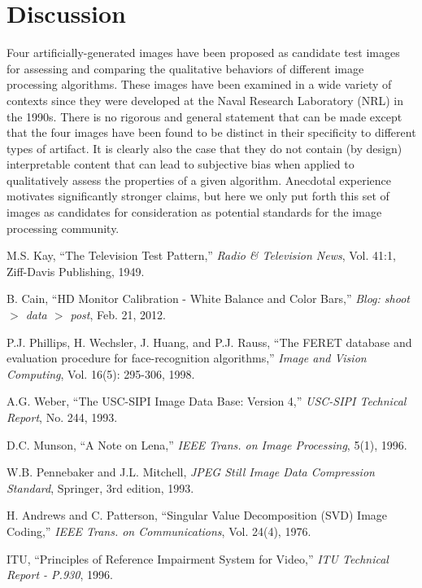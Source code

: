 \documentclass{article}
\begin{document}
\section{Discussion}

Four artificially-generated images have been proposed as candidate test images
for assessing and comparing the qualitative behaviors of different image 
processing algorithms. These images have been examined in a wide variety of
contexts since they were developed at the Naval Research Laboratory (NRL)
in the 1990s. There is no rigorous and general statement that can be made
except that the four images have been found to be distinct in their specificity to 
different types of artifact. It is clearly also the case that they do not contain
(by design) interpretable content that can lead to subjective bias when 
applied to qualitatively assess the properties of a given algorithm. 
Anecdotal experience motivates significantly stronger claims, but here we
only put forth this set of  images as candidates for consideration as
potential standards for the image processing community.


\begin{thebibliography}{7}

M.S. Kay, ``The Television Test Pattern,'' {\em Radio \& Television News}, 
Vol. 41:1, Ziff-Davis Publishing, 1949.

B. Cain, ``HD Monitor Calibration - White Balance and Color Bars,'' 
{\em Blog: shoot $>$ data $>$ post}, Feb. 21, 2012.

P.J. Phillips, H. Wechsler, J. Huang, and P.J. Rauss, ``The FERET database and evaluation procedure for face-recognition algorithms,''
{\em Image and Vision Computing}, Vol. 16(5): 295-306, 1998.

A.G. Weber, ``The USC-SIPI Image Data Base: Version 4,'' {\em USC-SIPI Technical Report}, No. 244, 1993.

D.C. Munson, ``A Note on Lena,'' {\em IEEE Trans. on Image Processing}, 5(1), 1996.

W.B. Pennebaker and J.L. Mitchell, {\em JPEG Still Image Data Compression Standard}, 
Springer, 3rd edition, 1993. 

H. Andrews and C. Patterson, ``Singular Value Decomposition (SVD) Image Coding,'' 
{\em IEEE Trans. on Communications}, Vol. 24(4), 1976.

ITU, ``Principles of Reference Impairment System for Video,'' {\em ITU Technical Report - P.930}, 1996.

\end{thebibliography}
\end{document}
